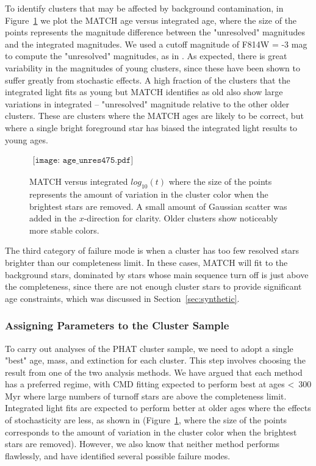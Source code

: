 \documentclass{emulateapj}
\begin{document}
To identify clusters that may be affected by background contamination, in Figure~\ref{fig:unres} we plot the MATCH age versus integrated age, where the size of the points represents the magnitude difference between the "unresolved" magnitudes and the integrated magnitudes.  We used a cutoff magnitude of F814W = -3 mag to compute the "unresolved" magnitudes, as in \cite{Beerman12}.  As expected, there is great variability in the magnitudes of young clusters, since these have been shown to suffer greatly from stochastic effects.  A high fraction of the clusters that the integrated light fits as young but MATCH identifies as old also show large variations in integrated -- "unresolved" magnitude relative to the other older clusters.  These are clusters where the MATCH ages are likely to be correct, but where a single bright foreground star has biased the integrated light results to young ages.


\begin{figure}[ht!]
   \begin{center}$
      \begin{array}{cc}
         \texttt{[image: age\_unres475.pdf]} 
      \end{array}$
   \end{center}
  \caption{MATCH versus integrated $log_{10} (t)$ where the size of the points represents the amount of variation in the cluster color when the brightest stars are removed.  A small amount of Gaussian scatter was added in the $x$-direction for clarity.  Older clusters show noticeably more stable colors.}
  \label{fig:unres}
\end{figure}



The third category of failure mode is when a cluster has too few resolved stars brighter than our completeness limit.  In these cases, MATCH will fit to the background stars, dominated by stars whose main sequence turn off is just above the completeness, since there are not enough cluster stars to provide significant age constraints, which was discussed in Section~\ref{sec:synthetic}.



\subsubsection{Assigning Parameters to the Cluster Sample}\label{sec:assign}

To carry out analyses of the PHAT cluster sample, we need to adopt a single "best" age, mass, and extinction for each cluster.  This step involves choosing the result from one of the two analysis methods.  We have argued that each method has a preferred regime, with CMD fitting expected to perform best at ages \textless\ 300 Myr where large numbers of turnoff stars are above the completeness limit.  Integrated light fits are expected to perform better at older ages where the effects of stochasticity are less, as shown in (Figure~\ref{fig:unres}, where the size of the points corresponds to the amount of variation in the cluster color when the brightest stars are removed).  However, we also know that neither method performs flawlessly, and have identified several possible failure modes.  
\end{document}

